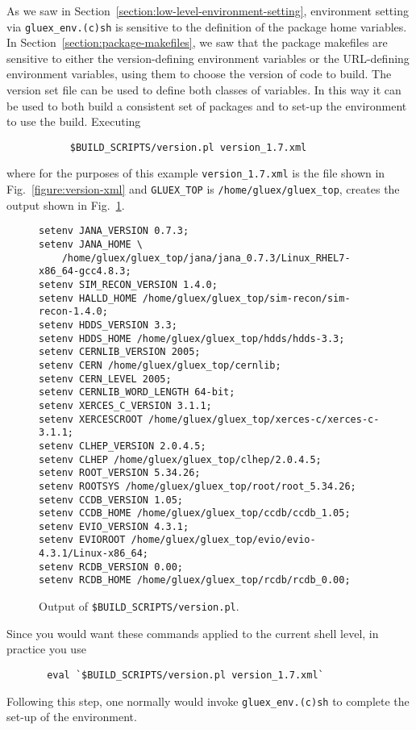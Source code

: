 \documentclass[12pt, letterpaper]{article}
\begin{document}
As we saw in Section~\ref{section:low-level-environment-setting},
environment setting via {\tt gluex\_env.(c)sh} is sensitive to the
definition of the package home variables. In
Section~\ref{section:package-makefiles}, we saw that the package
makefiles are sensitive to either the version-defining environment
variables or the URL-defining environment variables, using them to choose the
version of code to build. The version set file can be used to define both
classes of variables. In this way it can be used to both build a
consistent set of packages and to set-up the environment to use the
build. Executing
\begin{verbatim}
           $BUILD_SCRIPTS/version.pl version_1.7.xml
\end{verbatim}
where for the purposes of this example {\tt version\_1.7.xml} is the
file shown in Fig.~\ref{figure:version-xml} and {\tt GLUEX\_TOP} is
{\tt /home/gluex/gluex\_top}, creates the output shown in
Fig.~\ref{figure:version-pl-output}.
\begin{figure}
\small
\begin{verbatim}
setenv JANA_VERSION 0.7.3;
setenv JANA_HOME \
    /home/gluex/gluex_top/jana/jana_0.7.3/Linux_RHEL7-x86_64-gcc4.8.3;
setenv SIM_RECON_VERSION 1.4.0;
setenv HALLD_HOME /home/gluex/gluex_top/sim-recon/sim-recon-1.4.0;
setenv HDDS_VERSION 3.3;
setenv HDDS_HOME /home/gluex/gluex_top/hdds/hdds-3.3;
setenv CERNLIB_VERSION 2005;
setenv CERN /home/gluex/gluex_top/cernlib;
setenv CERN_LEVEL 2005;
setenv CERNLIB_WORD_LENGTH 64-bit;
setenv XERCES_C_VERSION 3.1.1;
setenv XERCESCROOT /home/gluex/gluex_top/xerces-c/xerces-c-3.1.1;
setenv CLHEP_VERSION 2.0.4.5;
setenv CLHEP /home/gluex/gluex_top/clhep/2.0.4.5;
setenv ROOT_VERSION 5.34.26;
setenv ROOTSYS /home/gluex/gluex_top/root/root_5.34.26;
setenv CCDB_VERSION 1.05;
setenv CCDB_HOME /home/gluex/gluex_top/ccdb/ccdb_1.05;
setenv EVIO_VERSION 4.3.1;
setenv EVIOROOT /home/gluex/gluex_top/evio/evio-4.3.1/Linux-x86_64;
setenv RCDB_VERSION 0.00;
setenv RCDB_HOME /home/gluex/gluex_top/rcdb/rcdb_0.00;
\end{verbatim}
\caption{Output of {\tt \$BUILD\_SCRIPTS/version.pl}.}\label{figure:version-pl-output}
\end{figure}
Since you would want these commands applied to the current shell level, in practice you use
\begin{verbatim}
       eval `$BUILD_SCRIPTS/version.pl version_1.7.xml`
\end{verbatim}
Following this step, one normally would invoke {\tt gluex\_env.(c)sh}
to complete the set-up of the environment.
\end{document}
